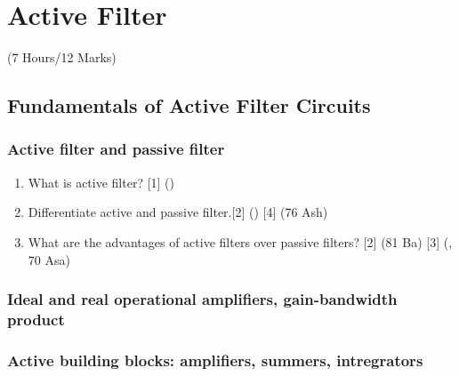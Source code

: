\documentclass[12pt]{article}
\begin{document}
	\pagebreak
	
\section{Active Filter}
	\begin{center}(7 Hours/12 Marks)\end{center}
	\subsection{Fundamentals of Active Filter Circuits}
		\subsubsection{Active filter and passive filter}
		\begin{enumerate}
			\item What is active filter? \hfill [1] ()

			\item Differentiate active and passive filter.\hfill [2] () [4] (76 Ash)
			
			\item What are the advantages of active filters over passive filters? \hfill [2] (81 Ba) [3] (, 70 Asa)
		\end{enumerate}
		
		\subsubsection{Ideal and real operational amplifiers, gain-bandwidth product}
		\subsubsection{Active building blocks: amplifiers, summers, intregrators}
\end{document}
